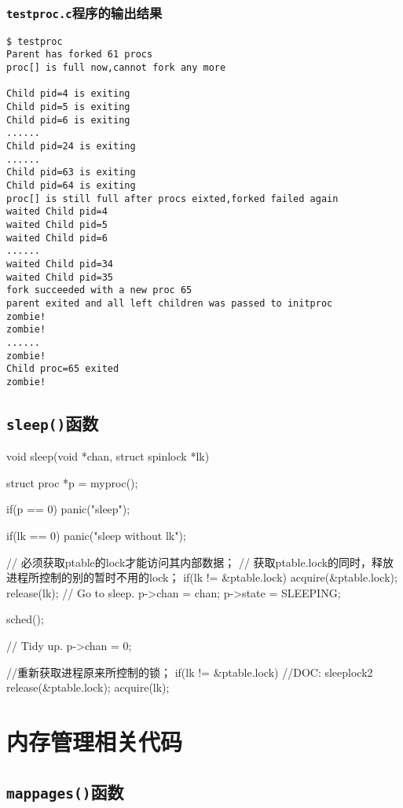 \documentclass{swfcthesismscctex}
\begin{document}
\subsubsection{\texttt{testproc.c}程序的输出结果}
\label{sec:testproc}

\begin{verbatim}
$ testproc
Parent has forked 61 procs
proc[] is full now,cannot fork any more

Child pid=4 is exiting
Child pid=5 is exiting
Child pid=6 is exiting
......
Child pid=24 is exiting
......
Child pid=63 is exiting
Child pid=64 is exiting
proc[] is still full after procs eixted,forked failed again
waited Child pid=4
waited Child pid=5
waited Child pid=6
......
waited Child pid=34
waited Child pid=35
fork succeeded with a new proc 65
parent exited and all left children was passed to initproc
zombie!
zombie!
......
zombie!
Child proc=65 exited
zombie!
\end{verbatim}

\subsection{\texttt{sleep()}函数}
\label{sec:sleep}

\begin{ccode}
void sleep(void *chan, struct spinlock *lk)
{
  struct proc *p = myproc();
  
  if(p == 0)
    panic("sleep");

  if(lk == 0)
    panic("sleep without lk");

  // 必须获取ptable的lock才能访问其内部数据；
  // 获取ptable.lock的同时，释放进程所控制的别的暂时不用的lock；
  if(lk != &ptable.lock){  
    acquire(&ptable.lock); 
    release(lk);
  }
  // Go to sleep.
  p->chan = chan;
  p->state = SLEEPING;

  sched();

  // Tidy up.
  p->chan = 0;

  //重新获取进程原来所控制的锁；
  if(lk != &ptable.lock){  //DOC: sleeplock2
    release(&ptable.lock);
    acquire(lk);
  }
}
\end{ccode}

\section{内存管理相关代码}
\subsection{\texttt{mappages()}函数}
\label{sec:mappages}
\end{document}
